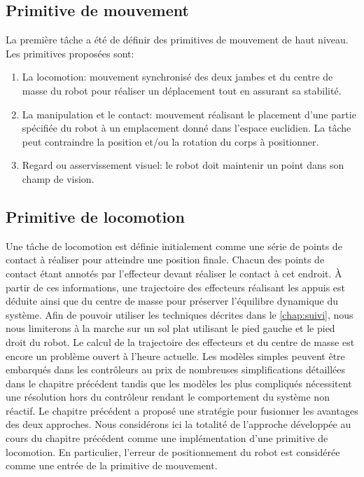 \subsection{Primitive de mouvement}

La première tâche a été de définir des primitives de mouvement de
haut niveau. Les primitives proposées sont:
\begin{enumerate}
\item La locomotion: mouvement synchronisé des deux
  jambes et du centre de masse du robot pour réaliser un déplacement
  tout en assurant sa stabilité.
\item La manipulation et le contact: mouvement
  réalisant le placement d'une partie spécifiée du robot à un
  emplacement donné dans l'espace euclidien. La tâche peut contraindre
  la position et/ou la rotation du corps à positionner.
\item Regard ou asservissement visuel: le
  robot doit maintenir un point dans son champ de vision.
\end{enumerate}


\subsection{Primitive de locomotion}

Une tâche de locomotion est définie initialement comme une série de
points de contact à réaliser pour atteindre une position
finale. Chacun des points de contact étant
annotés par l'effecteur devant réaliser le contact à cet endroit. À
partir de ces informations, une trajectoire des effecteurs réalisant
les appuis est déduite ainsi que du centre de masse pour préserver
l'équilibre dynamique du système. Afin de pouvoir utiliser les
techniques décrites dans le \autoref{chap:suivi}, nous nous limiterons
à la marche sur un sol plat utilisant le pied gauche et le pied droit
du robot. Le calcul de la trajectoire des effecteurs et du centre de
masse est encore un problème ouvert à l'heure actuelle. Les modèles
simples peuvent être embarqués dans les contrôleurs au prix de
nombreuses simplifications détaillées dans le chapitre précédent
tandis que les modèles les plus compliqués nécessitent une résolution
hors du contrôleur rendant le comportement du système non réactif. Le
chapitre précédent a proposé une stratégie pour fusionner les
avantages des deux approches. Nous considérons ici la totalité de
l'approche développée au cours du chapitre précédent comme une
implémentation d'une primitive de locomotion. En particulier, l'erreur
de positionnement du robot est considérée comme une entrée de la
primitive de mouvement.


